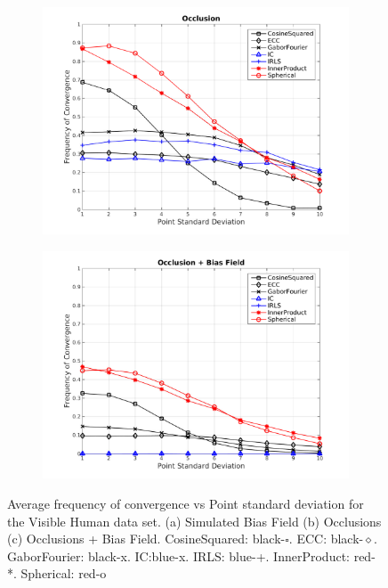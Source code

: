 \begin{figure}
\begin{subfigure}{0.52\textwidth}
        \caption{}\label{fig:lk_results_biasfield}
    \end{subfigure} \\
    \begin{subfigure}{0.52\textwidth}
        \includegraphics[width=\textwidth]{statistical_normals/lk/3d/images/Occlusion_Smoothing_2-crop}
        \caption{}\label{fig:lk_results_occlusion}
    \end{subfigure} \hspace*{-1cm}
    \begin{subfigure}{0.52\textwidth}
        \includegraphics[width=\textwidth]{statistical_normals/lk/3d/images/Occlusion_BiasField_Smoothing_2-crop}
        \caption{}\label{fig:lk_results_occlusion_biasfield}
    \end{subfigure}
    \caption{Average frequency of convergence vs Point standard deviation for 
             the Visible Human data set. (a) Simulated Bias Field (b) Occlusions
             (c) Occlusions + Bias Field. CosineSquared: black-$\square$. ECC:\@
             black-$\diamond$. GaborFourier: black-x. IC:\@ blue-x. IRLS:\@
             blue-+. InnerProduct: red-*. Spherical: red-o}
\label{fig:lk_results_corrupted}
\end{figure}
